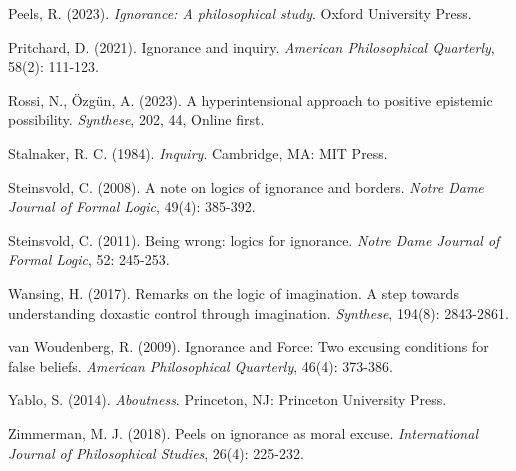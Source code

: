 \documentclass{article}
\begin{document}
 Peels, R. (2023). \textit{Ignorance: A philosophical study}. Oxford University Press.

 Pritchard, D. (2021). Ignorance and inquiry. \textit{American Philosophical Quarterly}, 58(2): 111-123.

 Rossi, N., \"{O}zg\"{u}n, A. (2023). A hyperintensional approach to positive epistemic possibility. \textit{Synthese}, 202, 44, Online first.

 Stalnaker, R. C. (1984). \textit{Inquiry}. Cambridge, MA: MIT Press.

 Steinsvold, C. (2008). A note on logics of ignorance and borders. \textit{Notre Dame Journal of Formal Logic}, 49(4): 385-392.

 Steinsvold, C. (2011). Being wrong: logics for ignorance. \textit{Notre Dame Journal of Formal Logic}, 52: 245-253.



 Wansing, H. (2017). Remarks on the logic of imagination. A step towards understanding doxastic control through imagination. \textit{Synthese}, 194(8): 2843-2861.

 van Woudenberg, R. (2009). Ignorance and Force: Two excusing conditions for false beliefs. \textit{American Philosophical Quarterly}, 46(4): 373-386.

 Yablo, S. (2014). \textit{Aboutness}. Princeton, NJ: Princeton University Press.

 Zimmerman, M. J. (2018). Peels on ignorance as moral excuse. \textit{International Journal of Philosophical Studies}, 26(4): 225-232.
\end{document}
